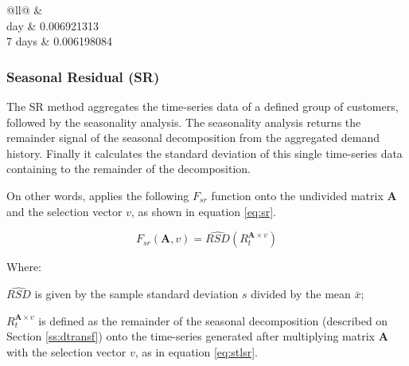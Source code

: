 \documentclass[preprint,3p,12pt,authoryear]{elsarticle}
\begin{document}
\begin{table}[]
	\centering
	\caption{Results for different in-sample period oversaw by FV optimisation}
	\label{tb_fvperselec}
	\begin{tabular}{@{}ll@{}}
	\toprule
	 &  \\  day                                                                                                             & 0.006921313                               	\\
	7 days                                                                                                            & 0.006198084                               	\\ \bottomrule
	\end{tabular}
\end{table}

\subsubsection{Seasonal Residual (SR)}
\label{sss:SR}
The SR method aggregates the time-series data of a defined group of customers, followed by the seasonality analysis.
The seasonality analysis returns the remainder signal of the seasonal decomposition from the aggregated demand history.
Finally it calculates the standard deviation of this single time-series data containing to the remainder of the decomposition.

On other words, applies the following $F_{sr}$ function onto the undivided matrix $\bm{A}$ and the selection vector $v$, as shown in equation \ref{eq:sr}.

\begin{equation}
   F_{sr}(\bm{A},v) = \widehat{RSD}(R^{\bm{A} \times v}_t)
   \label{eq:sr}
\end{equation}

Where:

$\widehat{RSD}$ is given by the sample standard deviation $s$ divided by the mean $\bar{x}$;

$R^{\bm{A} \times v}_t$ is defined as the remainder of the seasonal decomposition (described on Section \ref{ss:dtransf}) onto the time-series generated after multiplying matrix $\bm{A}$ with the selection vector $v$, as in equation \ref{eq:stlsr}.
\end{document}
